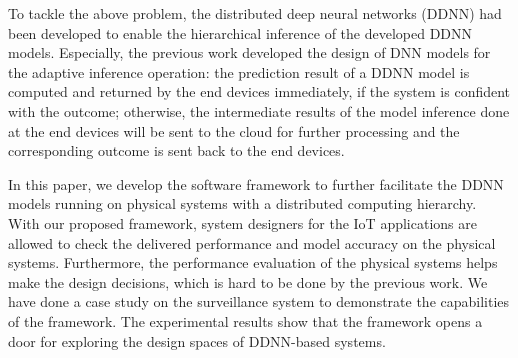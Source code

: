 \documentclass[conference]{IEEEtran}
\begin{document}
To tackle the above problem, the distributed deep neural networks (DDNN) \cite{Teerapittayanon17} had been developed to enable the hierarchical inference of the developed DDNN models. Especially, the previous work developed the design of DNN models for the adaptive inference operation: the prediction result of a DDNN model is computed and returned by the end devices immediately, if the system is confident with the outcome; otherwise, the intermediate results of the model inference done at the end devices will be sent to the cloud for further processing and the corresponding outcome is sent back to the end devices.

In this paper, we develop the software framework to further facilitate the DDNN models running on physical systems with a distributed computing hierarchy. With our proposed framework, system designers for the IoT applications are allowed to check the delivered performance and model accuracy on the physical systems. Furthermore, the performance evaluation of the physical systems helps make the design decisions, which is hard to be done by the previous work. We have done a case study on the surveillance system to demonstrate the capabilities of the framework.%
 The experimental results show that the framework opens a door for exploring the design spaces of DDNN-based systems.


%
%
\end{document}
